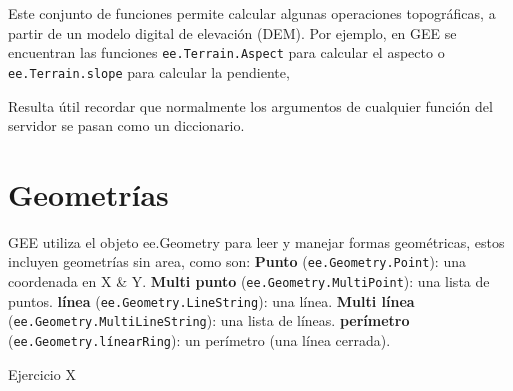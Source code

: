 \documentclass[
]{article}
\begin{document}
Este conjunto de funciones permite calcular algunas operaciones
topográficas, a partir de un modelo digital de elevación (DEM). Por
ejemplo, en GEE se encuentran las funciones \texttt{ee.Terrain.Aspect}
para calcular el aspecto o \texttt{ee.Terrain.slope} para calcular la
pendiente,

\begin{tipblock}
Resulta útil recordar que normalmente los argumentos de cualquier
función del servidor se pasan como un diccionario.

\end{tipblock}

\newpage

\hypertarget{geometruxedas}{%
\section{Geometrías}\label{geometruxedas}}

GEE utiliza el objeto ee.Geometry para leer y manejar formas
geométricas, estos incluyen geometrías sin area, como son:
\textbf{Punto} (\texttt{ee.Geometry.Point}): una coordenada en X \& Y.
\textbf{Multi punto} (\texttt{ee.Geometry.MultiPoint}): una lista de
puntos. \textbf{línea} (\texttt{ee.Geometry.LineString}): una línea.
\textbf{Multi línea} (\texttt{ee.Geometry.MultiLineString}): una lista
de líneas. \textbf{perímetro} (\texttt{ee.Geometry.línearRing}): un
perímetro (una línea cerrada).

Ejercicio X
\end{document}
